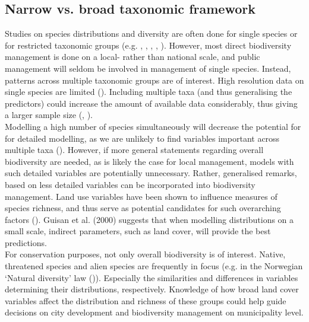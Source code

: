 \documentclass{article}
\begin{document}
\subsection{Narrow vs. broad taxonomic framework}
Studies on species distributions and diversity are often done for single species or for  restricted taxonomic groups (e.g. \cite{Kattwinkel2009}, \cite{Milanovich2012}, \cite{Turrini2015a}, \cite{Ives2016}, \cite{Egerer2017}). %
However, most direct biodiversity management is done on a local- rather than national scale, and public management will seldom be involved in management of single species. Instead, patterns across multiple taxonomic groups are of interest.
High resolution data on single species are limited (\cite{Guisan2000}). Including multiple taxa (and thus generalising the predictors) could increase the amount of available data considerably, thus giving a larger sample size (\cite{Stockwell2002}, \cite{Graham2004}). \\
Modelling a high number of species simultaneously will decrease the potential for for detailed modelling, as we are unlikely to find variables important across multiple taxa (\cite{Chapman2011}). 
However, if more general statements regarding overall biodiversity are needed, as is likely the case for local management, models with such detailed variables are potentially unnecessary. Rather, generalised remarks, based on less detailed variables can be incorporated into biodiversity management. Land use variables have been shown to influence measures of species richness, and thus serve as potential candidates for such overarching factors (\cite{Gerstner2014}). Guisan et al. (2000) suggests that when modelling distributions on a small scale, indirect parameters, such as land cover, will provide the best predictions.\\ %
For conservation purposes, not only overall biodiversity is of interest. Native, threatened species  and alien species are frequently in focus (e.g. in the Norwegian `Natural diversity' law (\cite{nml2009})). 
Especially the similarities and differences in variables determining their distributions, respectively.  Knowledge of how broad land cover variables affect the distribution and richness of these groups could help guide decisions on city development and biodiversity management on municipality level.\\ %

\end{document}
